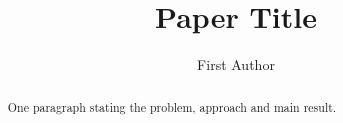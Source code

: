 \documentclass{llncs}
\begin{document}
\pdfpagewidth=210mm \pdfpageheight=297mm
\title{Paper Title}
\author{First Author}
\maketitle
\begin{abstract}
One paragraph stating the problem, approach and main result.
\end{abstract}




\end{document}
